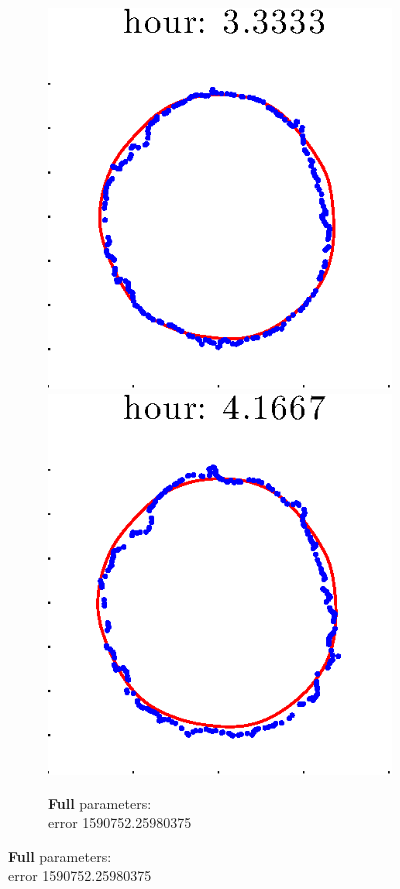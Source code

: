\documentclass[12pt]{article}
\begin{document}
\begin{figure}[h!]
\begin{subfigure}[b]{.3\textwidth}
		\includegraphics[height=.15\textheight]{Pos0/secondhalf/full5.eps}
		\includegraphics[height=.15\textheight]{Pos0/secondhalf/full6.eps}
		\caption{\textbf{Full} parameters: \\error 1590752.25980375}

\end{subfigure}
\end{figure}
\end{document}
